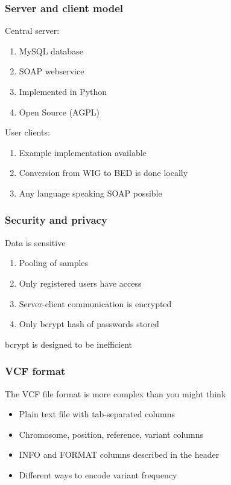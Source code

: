 \documentclass[slidestop]{beamer}
\begin{document}
\begin{frame}
  \frametitle{Server and client model}
  Central server:
  \begin{enumerate}
    \item MySQL database
    \item SOAP webservice
    \item Implemented in Python
    \item Open Source (AGPL)
  \end{enumerate}
  \vspace{1cm}
  \pause
  User clients:
  \begin{enumerate}
    \item Example implementation available
    \item Conversion from WIG to BED is done locally
    \item Any language speaking SOAP possible
  \end{enumerate}
\end{frame}

\begin{frame}
  \frametitle{Security and privacy}
  Data is sensitive
  \begin{enumerate}
    \item Pooling of samples
    \item Only registered users have access
    \item Server-client communication is encrypted
    \item Only bcrypt hash of passwords stored {\bf*}
  \end{enumerate}
  \vspace{1cm}
  \pause
  {\bf*} bcrypt is designed to be inefficient
\end{frame}

\begin{frame}
  \frametitle{VCF format}
  The VCF file format is more complex than you might think
  \begin{itemize}
    \item Plain text file with tab-separated columns
    \item Chromosome, position, reference, variant columns
    \item INFO and FORMAT columns described in the header
    \item Different ways to encode variant frequency
  \end{itemize}
\end{frame}
\end{document}
